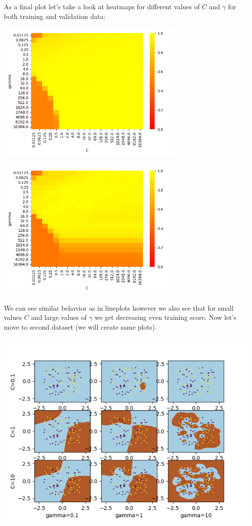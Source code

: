 \documentclass[a4paper]{article}
\begin{document}
	As a final plot let's take a look at heatmaps for different values of $C$ and $\gamma$ for both training and validation data:
	
	\centerline{\includegraphics[width=0.7\textwidth]{dataset_1_train_heatmap_scores}}  
	
	\centerline{\includegraphics[width=0.7\textwidth]{dataset_1_validation_heatmap_scores}}  
	
	We can see similar behavior as in lineplots however we also see that for small values $C$ and large values of $\gamma$ we get decreasing even training score.
	\newpage
	Now let's move to second dataset (we will create same plots).
	
	\centerline{\includegraphics[width=1.1\textwidth]{dataset_2_diff_c_gamma}}
	
\end{document}
